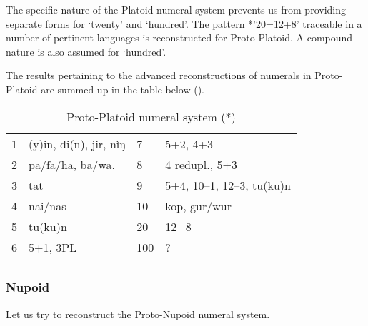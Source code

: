 The specific nature of the Platoid numeral system prevents us from providing separate forms for ‘twenty’ and ‘hundred’. The pattern *’20=12+8’ traceable in a number of pertinent languages is reconstructed for Proto-Platoid. A compound nature is also assumed for ‘hundred’.

The results pertaining to the advanced reconstructions of numerals in Proto-Platoid are summed up in the table below ().

\begin{table}
\caption{\label{tab:3:47}Proto-Platoid numeral system (*)}
\begin{tabularx}{\textwidth}{lXlX}
\lsptoprule
{1} & (y)in, di(n), jir, nìŋ & {7} & 5+2, 4+3\\
{2} & pa/fa/ha, ba/wa. & {8} & 4 redupl., 5+3\\
{3} & tat & {9} & 5+4, 10--1, 12--3, tu(ku)n\\
{4} & nai/nas & {10} & kop, gur/wur\\
{5} & tu(ku)n & {20} & 12+8\\
{6} & 5+1, 3PL & {100} & ?\\
\lspbottomrule
\end{tabularx}
\end{table}

\newpage  
\subsubsection{Nupoid}\label{sec:3.1.2.9}
Let us try to reconstruct the Proto-Nupoid numeral system.

